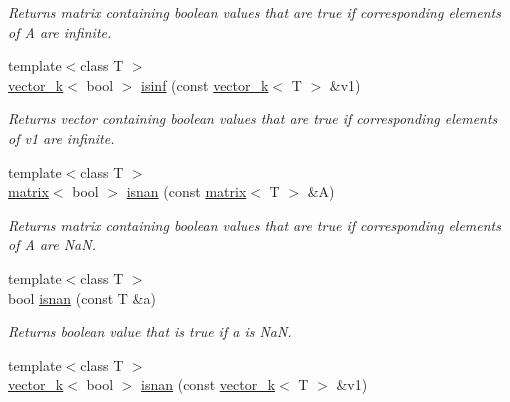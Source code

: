 \begin{DoxyCompactItemize}
\begin{DoxyCompactList}\small\item\em Returns matrix containing boolean values that are true if corresponding elements of A are infinite. \end{DoxyCompactList}\item 
\hypertarget{namespacekeycpp_af104a680d8727dc0653925a834764ab4}{{\footnotesize template$<$class T $>$ }\\\hyperlink{classkeycpp_1_1vector__k}{vector\-\_\-k}$<$ bool $>$ \hyperlink{namespacekeycpp_af104a680d8727dc0653925a834764ab4}{isinf} (const \hyperlink{classkeycpp_1_1vector__k}{vector\-\_\-k}$<$ T $>$ \&v1)}\label{namespacekeycpp_af104a680d8727dc0653925a834764ab4}

\begin{DoxyCompactList}\small\item\em Returns vector containing boolean values that are true if corresponding elements of v1 are infinite. \end{DoxyCompactList}\item 
\hypertarget{namespacekeycpp_ad3b16064066dc041be364e6fbefa173a}{{\footnotesize template$<$class T $>$ }\\\hyperlink{classkeycpp_1_1matrix}{matrix}$<$ bool $>$ \hyperlink{namespacekeycpp_ad3b16064066dc041be364e6fbefa173a}{isnan} (const \hyperlink{classkeycpp_1_1matrix}{matrix}$<$ T $>$ \&A)}\label{namespacekeycpp_ad3b16064066dc041be364e6fbefa173a}

\begin{DoxyCompactList}\small\item\em Returns matrix containing boolean values that are true if corresponding elements of A are Na\-N. \end{DoxyCompactList}\item 
\hypertarget{namespacekeycpp_ad91dbdf14632d313a304d3ddbadf935f}{{\footnotesize template$<$class T $>$ }\\bool \hyperlink{namespacekeycpp_ad91dbdf14632d313a304d3ddbadf935f}{isnan} (const T \&a)}\label{namespacekeycpp_ad91dbdf14632d313a304d3ddbadf935f}

\begin{DoxyCompactList}\small\item\em Returns boolean value that is true if a is Na\-N. \end{DoxyCompactList}\item 
\hypertarget{namespacekeycpp_ac54a98797b243f8f8b13b897cdeeba1c}{{\footnotesize template$<$class T $>$ }\\\hyperlink{classkeycpp_1_1vector__k}{vector\-\_\-k}$<$ bool $>$ \hyperlink{namespacekeycpp_ac54a98797b243f8f8b13b897cdeeba1c}{isnan} (const \hyperlink{classkeycpp_1_1vector__k}{vector\-\_\-k}$<$ T $>$ \&v1)}\label{namespacekeycpp_ac54a98797b243f8f8b13b897cdeeba1c}


\end{DoxyCompactItemize}
